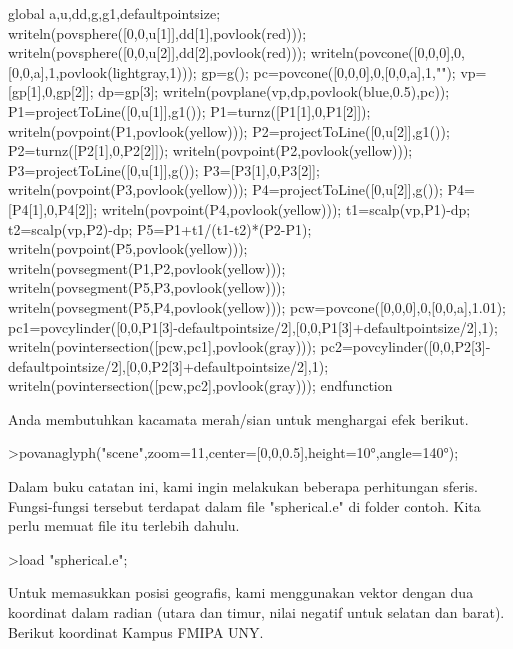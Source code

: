 \documentclass[a4paper,10pt]{article}
\begin{document}
\begin{eulernotebook}
\begin{eulercomment}
\begin{eulercomment}
\begin{eulerudf}
  global a,u,dd,g,g1,defaultpointsize;
  writeln(povsphere([0,0,u[1]],dd[1],povlook(red)));
  writeln(povsphere([0,0,u[2]],dd[2],povlook(red)));
  writeln(povcone([0,0,0],0,[0,0,a],1,povlook(lightgray,1)));
  gp=g();
  pc=povcone([0,0,0],0,[0,0,a],1,"");
  vp=[gp[1],0,gp[2]]; dp=gp[3];
  writeln(povplane(vp,dp,povlook(blue,0.5),pc));
  P1=projectToLine([0,u[1]],g1()); P1=turnz([P1[1],0,P1[2]]);
  writeln(povpoint(P1,povlook(yellow)));
  P2=projectToLine([0,u[2]],g1()); P2=turnz([P2[1],0,P2[2]]);
  writeln(povpoint(P2,povlook(yellow)));
  P3=projectToLine([0,u[1]],g()); P3=[P3[1],0,P3[2]];
  writeln(povpoint(P3,povlook(yellow)));
  P4=projectToLine([0,u[2]],g()); P4=[P4[1],0,P4[2]];
  writeln(povpoint(P4,povlook(yellow)));
  t1=scalp(vp,P1)-dp; t2=scalp(vp,P2)-dp; P5=P1+t1/(t1-t2)*(P2-P1);
  writeln(povpoint(P5,povlook(yellow)));
  writeln(povsegment(P1,P2,povlook(yellow)));
  writeln(povsegment(P5,P3,povlook(yellow)));
  writeln(povsegment(P5,P4,povlook(yellow)));
  pcw=povcone([0,0,0],0,[0,0,a],1.01);
  pc1=povcylinder([0,0,P1[3]-defaultpointsize/2],[0,0,P1[3]+defaultpointsize/2],1);
  writeln(povintersection([pcw,pc1],povlook(gray)));
  pc2=povcylinder([0,0,P2[3]-defaultpointsize/2],[0,0,P2[3]+defaultpointsize/2],1);
  writeln(povintersection([pcw,pc2],povlook(gray)));
  endfunction
\end{eulerudf}
\begin{eulercomment}
Anda membutuhkan kacamata merah/sian untuk menghargai efek berikut.
\end{eulercomment}
\begin{eulerprompt}
>povanaglyph("scene",zoom=11,center=[0,0,0.5],height=10°,angle=140°);
\end{eulerprompt}
\begin{eulercomment}
Dalam buku catatan ini, kami ingin melakukan beberapa perhitungan
sferis. Fungsi-fungsi tersebut terdapat dalam file "spherical.e" di
folder contoh. Kita perlu memuat file itu terlebih dahulu.
\end{eulercomment}
\begin{eulerprompt}
>load "spherical.e";
\end{eulerprompt}
\begin{eulercomment}
Untuk memasukkan posisi geografis, kami menggunakan vektor dengan dua
koordinat dalam radian (utara dan timur, nilai negatif untuk selatan
dan barat). Berikut koordinat Kampus FMIPA UNY.
\end{eulercomment}
\begin{eulerprompt}

\end{eulerprompt}
\end{eulercomment}
\end{eulercomment}
\end{eulernotebook}
\end{document}
